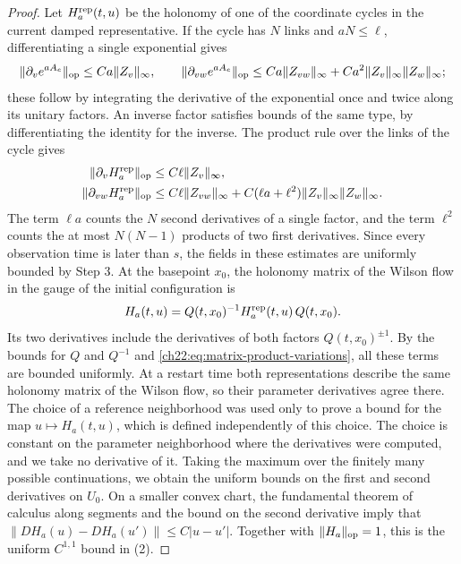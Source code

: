 \begin{proof}
Let $H_a^{\rm rep}(t,u)$ be the holonomy of one of the coordinate cycles in the current damped representative. If the cycle has $N$ links and $aN\le\ell$, differentiating a single exponential gives
\[
 \|\partial_ve^{aA_e}\|_{\rm op}\le Ca\|Z_v\|_\infty,\qquad
 \|\partial_{vw}e^{aA_e}\|_{\rm op}\le Ca\|Z_{vw}\|_\infty+Ca^2\|Z_v\|_\infty\|Z_w\|_\infty ;
\]
these follow by integrating the derivative of the exponential once and twice along its unitary factors. An inverse factor satisfies bounds of the same type, by differentiating the identity for the inverse. The product rule over the links of the cycle gives
\begin{equation}\label{ch22:eq:matrix-product-variations}
 \begin{split}
 \|\partial_vH_a^{\rm rep}\|_{\rm op}&\le C\ell\|Z_v\|_\infty,\\
 \|\partial_{vw}H_a^{\rm rep}\|_{\rm op}&\le C\ell\|Z_{vw}\|_\infty+C(\ell a+\ell^2)\|Z_v\|_\infty\|Z_w\|_\infty .
 \end{split}
\end{equation}
The term $\ell a$ counts the $N$ second derivatives of a single factor, and the term $\ell^2$ counts the at most $N(N-1)$ products of two first derivatives. Since every observation time is later than $s$, the fields in these estimates are uniformly bounded by Step 3. At the basepoint $x_0$, the holonomy matrix of the Wilson flow in the gauge of the initial configuration is
\begin{equation}\label{ch22:eq:matrix-in-initial-frame}
 H_a(t,u)=Q(t,x_0)^{-1}H_a^{\rm rep}(t,u)\,Q(t,x_0).
\end{equation}
Its two derivatives include the derivatives of both factors $Q(t,x_0)^{\pm1}$. By the bounds for $Q$ and $Q^{-1}$ and \eqref{ch22:eq:matrix-product-variations}, all these terms are bounded uniformly. At a restart time both representations describe the same holonomy matrix of the Wilson flow, so their parameter derivatives agree there. The choice of a reference neighborhood was used only to prove a bound for the map $u\mapsto H_a(t,u)$, which is defined independently of this choice. The choice is constant on the parameter neighborhood where the derivatives were computed, and we take no derivative of it. Taking the maximum over the finitely many possible continuations, we obtain the uniform bounds on the first and second derivatives on $U_0$. On a smaller convex chart, the fundamental theorem of calculus along segments and the bound on the second derivative imply that $\|DH_a(u)-DH_a(u')\|\le C|u-u'|$. Together with $\|H_a\|_{\rm op}=1$, this is the uniform $C^{1,1}$ bound in (2).


\end{proof}
